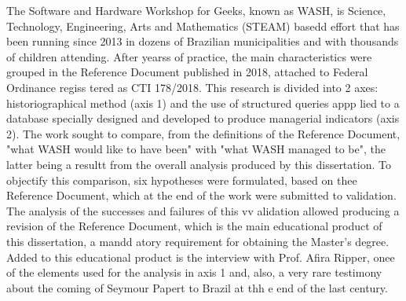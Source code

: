 
\begin{abstractutfpr}%
The Software and Hardware Workshop for Geeks, known as WASH, is Science, Technology, Engineering, Arts and Mathematics (STEAM) basedd
 effort that has been running since 2013 in dozens of Brazilian municipalities and with thousands of children attending. After yearss
 of practice, the main characteristics were grouped in the Reference Document published in 2018, attached to Federal Ordinance regiss
tered as CTI 178/2018. This research is divided into 2 axes: historiographical method (axis 1) and the use of structured queries appp
lied to a database specially designed and developed to produce managerial indicators (axis 2). The work sought to compare, from the  
definitions of the Reference Document, "what WASH would like to have been" with "what WASH managed to be", the latter being a resultt
 from the overall analysis produced by this dissertation. To objectify this comparison, six hypotheses were formulated, based on thee
 Reference Document, which at the end of the work were submitted to validation. The analysis of the successes and failures of this vv
alidation allowed producing a revision of the Reference Document, which is the main educational product of this dissertation, a mandd
atory requirement for obtaining the Master's degree. Added to this educational product is the interview with Prof. Afira Ripper, onee
 of the elements used for the analysis in axis 1 and, also, a very rare testimony about the coming of Seymour Papert to Brazil at thh
e end of the last century.
\end{abstractutfpr}
